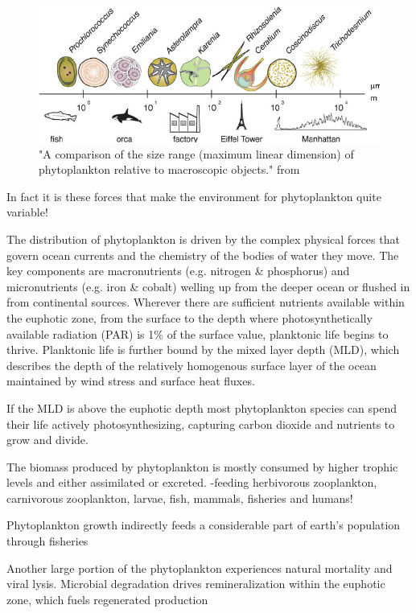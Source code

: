 \begin{figure}
\centering
\includegraphics[trim = 0mm 0mm 0mm 0mm, clip, width=.9\linewidth]{./Chp1-Intro/SIZEphytoComparison_FinkelEtAl2010.png}
\caption[Scheme]{{\small "A comparison of the size range (maximum linear dimension) of phytoplankton %
relative to macroscopic objects." from \cite{Finkel2010}}}
\label{FinkelPhySizeRange}
\end{figure}

In fact it is these forces that make the environment for phytoplankton quite variable!

The distribution of phytoplankton is driven by the complex physical forces that govern ocean currents and the chemistry of the bodies of water they move. The key components are macronutrients (e.g. nitrogen \& phosphorus) and micronutrients (e.g. iron \& cobalt) welling up from the deeper ocean or flushed in from continental sources. Wherever there are sufficient nutrients available within the euphotic zone, from the surface to the depth where photosynthetically available radiation (PAR) is 1\% of the surface value, planktonic life begins to thrive. Planktonic life is further bound by the mixed layer depth (MLD), which describes the depth of the relatively homogenous surface layer of the ocean maintained by wind stress and surface heat fluxes.
 
If the MLD is above the euphotic depth most phytoplankton species can spend their life actively photosynthesizing, capturing carbon dioxide and nutrients to grow and divide. 

The biomass produced by phytoplankton is mostly consumed by higher trophic levels and either assimilated or excreted. 
-feeding herbivorous zooplankton, carnivorous zooplankton, larvae, fish, mammals, fisheries and humans!

Phytoplankton growth indirectly feeds a considerable part of earth’s population through fisheries \citep{Stock2017} 

Another large portion of the phytoplankton experiences natural mortality and viral lysis. Microbial degradation drives remineralization within the euphotic zone, which fuels regenerated production \citep{Eppley1979}

